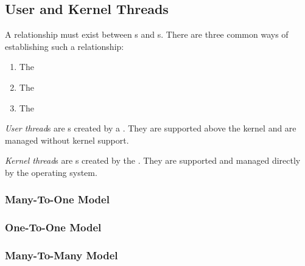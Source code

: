 \subsection{User and Kernel Threads}\label{subsec:User_Kernel_Threads}
A relationship must exist between s and s.
There are three common ways of establishing such a relationship:
\begin{enumerate}[noitemsep]
\item The 
\item The 
\item The 
\end{enumerate}

\begin{definition}\label{def:User_Thread}
  \emph{User thread}s are s created by a  .
  They are supported above the kernel and are managed without kernel support.
\end{definition}

\begin{definition}\label{def:Kernel_Thread}
  \emph{Kernel thread}s are s created by the .
  They are supported and managed directly by the operating system.
\end{definition}

\subsubsection{Many-To-One Model}\label{subsubsec:Many_To_One_Model}
\subsubsection{One-To-One Model}\label{subsubsec:One_To_One_Model}
\subsubsection{Many-To-Many Model}\label{subsubsec:Many_To_Many_Model}

